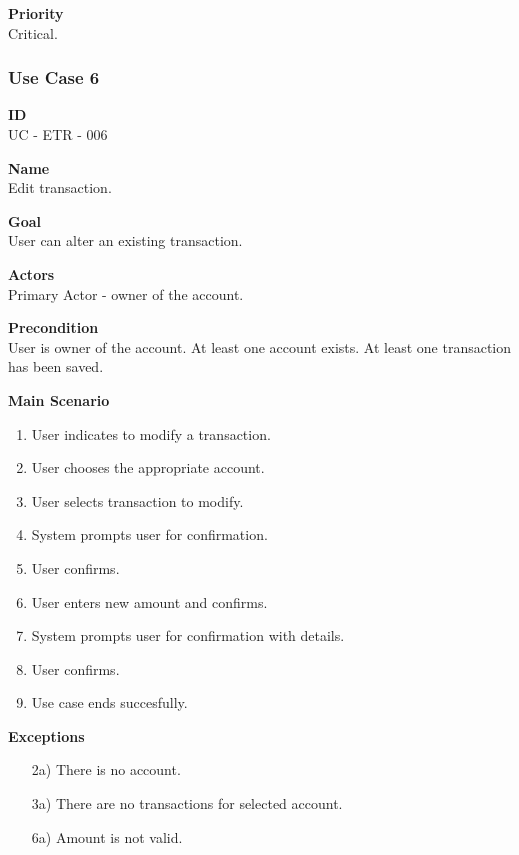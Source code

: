 \documentclass[12pt]{article}
\begin{document}
\noindent
{\bf Priority}\\
Critical.

\subsubsection{Use Case 6} \label{uc:6}

\noindent
{\bf ID}\\
UC - ETR - 006

\noindent
{\bf Name}\\
Edit transaction.

\noindent
{\bf Goal}\\
User can alter an existing transaction.

\noindent
{\bf Actors}\\
Primary Actor - owner of the account.

\noindent
{\bf Precondition}\\
User is owner of the account.
At least one account exists.
At least one transaction has been saved.

\noindent
{\bf Main Scenario}\\
\vspace*{-0.2in}
\begin{enumerate}
  \item User indicates to modify a transaction.
  \item User chooses the appropriate account.
  \item User selects transaction to modify.
  \item System prompts user for confirmation.
  \item User confirms.
  \item User enters new amount and confirms.
  \item System prompts user for confirmation with details.
  \item User confirms.
  \item Use case ends succesfully.
\end{enumerate}

\noindent
    {\bf Exceptions}\\
    \vspace{-0.2in}
    \begin{itemize}
    \item[2a)] There is no account.
    \item[3a)] There are no transactions for selected account.
    \item[6a)] Amount is not valid.
    \end{itemize}
\end{document}
